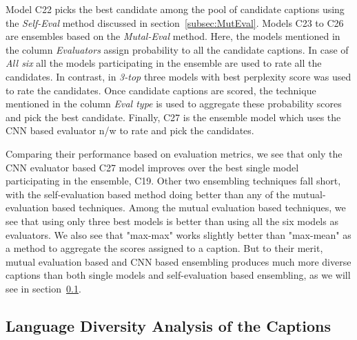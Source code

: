 Model C22 picks the best candidate among the pool of candidate captions using
the \emph{Self-Eval} method discussed in section~\ref{subsec:MutEval}.
Models C23 to C26 are ensembles based on the \emph{Mutal-Eval} method.
Here, the models mentioned in the column \emph{Evaluators} assign probability to
all the candidate captions.
In case of \emph{All six} all the models participating in the ensemble are used
to rate all the candidates.
In contrast, in \emph{3-top} three models with best perplexity score was used to
rate the candidates.
Once candidate captions are scored, the technique mentioned in the column
\emph{Eval type} is used to aggregate these probability scores and pick the best
candidate. 
Finally, C27 is the ensemble model which uses the CNN based evaluator n/w to rate and
pick the candidates.

Comparing their performance based on evaluation metrics, we see that only the
CNN evaluator based C27 model improves over the best single model participating
in the ensemble, C19.
Other two ensembling techniques fall short, with the self-evaluation based
method doing better than any of the mutual-evaluation based techniques.
Among the mutual evaluation based techniques, we see that using only three best
models is better than using all the six models as evaluators.
We also see that "max-max" works slightly better than "max-mean" as a method to
aggregate the scores assigned to a caption.
But to their merit, mutual evaluation based and CNN based ensembling produces
much more diverse captions than both single models and self-evaluation based
ensembling, as we will see in section~\ref{subsubsec:QualAnalCoc}.

\subsection{Language Diversity Analysis of the Captions}
\label{subsubsec:QualAnalCoc}

